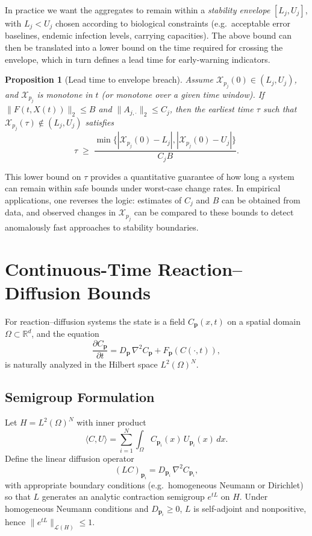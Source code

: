 \documentclass[12pt,letterpaper]{article}
\newtheorem{proposition}{Proposition}[section]
\newcommand{\bp}{\mathbf{p}}
\begin{document}
In practice we want the aggregates to remain within a \emph{stability
envelope} $[L_j,U_j]$, with $L_j < U_j$ chosen according to biological
constraints (e.g.\ acceptable error baselines, endemic infection levels,
carrying capacities). The above bound can then be translated into a lower
bound on the time required for crossing the envelope, which in turn defines a
lead time for early-warning indicators.

\begin{proposition}[Lead time to envelope breach]
Assume $\mathcal{X}_{p_j}(0) \in (L_j,U_j)$, and $\mathcal{X}_{p_j}$ is
monotone in $t$ (or monotone over a given time window). If
$\|F(t,X(t))\|_2 \le B$ and $\|A_{j,\cdot}\|_2 \le C_j$, then the earliest
time $\tau$ such that $\mathcal{X}_{p_j}(\tau) \notin (L_j,U_j)$ satisfies
\[
  \tau \;\geq\; \frac{\min\{|\mathcal{X}_{p_j}(0)-L_j|,
                              |\mathcal{X}_{p_j}(0)-U_j|\}}{C_j B}.
\]
\end{proposition}

This lower bound on $\tau$ provides a quantitative guarantee of how long a
system can remain within safe bounds under worst-case change rates. In
empirical applications, one reverses the logic: estimates of $C_j$ and $B$
can be obtained from data, and observed changes in $\mathcal{X}_{p_j}$ can be
compared to these bounds to detect anomalously fast approaches to stability
boundaries.

\section{Continuous-Time Reaction--Diffusion Bounds}

For reaction--diffusion systems the state is a field
$C_{\bp}(x,t)$ on a spatial domain $\Omega \subset \mathbb{R}^d$, and the
equation
\begin{equation}
  \frac{\partial C_{\bp}}{\partial t}
  = D_{\bp}\,\nabla^2 C_{\bp} + F_{\bp}(C(\cdot,t)),
  \label{eq:RD-appendix}
\end{equation}
is naturally analyzed in the Hilbert space $L^2(\Omega)^N$.

\subsection{Semigroup Formulation}

Let $H = L^2(\Omega)^N$ with inner product
\[
  \langle C, U \rangle
  = \sum_{i=1}^N \int_\Omega C_{\bp_i}(x)\,U_{\bp_i}(x)\,dx.
\]
Define the linear diffusion operator
\[
  (L C)_{\bp_i}
  = D_{\bp_i}\,\nabla^2 C_{\bp_i},
\]
with appropriate boundary conditions (e.g.\ homogeneous Neumann or Dirichlet)
so that $L$ generates an analytic contraction semigroup
$e^{tL}$ on $H$. Under homogeneous Neumann conditions and $D_{\bp_i}\ge 0$,
$L$ is self-adjoint and nonpositive, hence $\|e^{tL}\|_{\mathcal{L}(H)} \le 1$.
\end{document}
